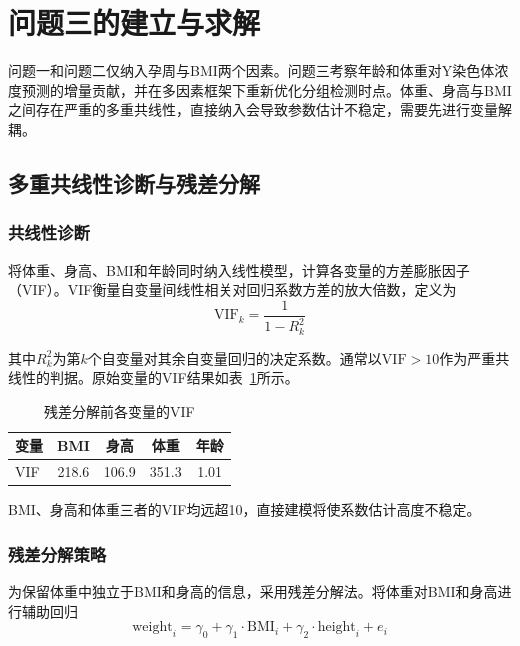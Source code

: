 \section{问题三的建立与求解}

问题一和问题二仅纳入孕周与BMI两个因素。问题三考察年龄和体重对Y染色体浓度预测的增量贡献，并在多因素框架下重新优化分组检测时点。体重、身高与BMI之间存在严重的多重共线性，直接纳入会导致参数估计不稳定，需要先进行变量解耦。

\subsection{多重共线性诊断与残差分解}

\subsubsection{共线性诊断}

将体重、身高、BMI和年龄同时纳入线性模型，计算各变量的方差膨胀因子（VIF）。VIF衡量自变量间线性相关对回归系数方差的放大倍数，定义为
\begin{equation}\label{eq:vif}
  \mathrm{VIF}_k = \frac{1}{1 - R_k^2}
\end{equation}

其中$R_k^2$为第$k$个自变量对其余自变量回归的决定系数。通常以$\mathrm{VIF} > 10$作为严重共线性的判据。原始变量的VIF结果如表~\ref{tab:vif_before}所示。

\begin{table}[H]
  \caption{残差分解前各变量的VIF}
  \label{tab:vif_before}
  \centering
  \begin{tabular}{lcccc}
    \hline
    变量 & BMI & 身高 & 体重 & 年龄 \\
    \hline
    VIF & 218.6 & 106.9 & 351.3 & 1.01 \\
    \hline
  \end{tabular}
\end{table}

BMI、身高和体重三者的VIF均远超10，直接建模将使系数估计高度不稳定。

\subsubsection{残差分解策略}

为保留体重中独立于BMI和身高的信息，采用残差分解法。将体重对BMI和身高进行辅助回归
\begin{equation}\label{eq:resid_decomp}
  \text{weight}_i = \gamma_0 + \gamma_1 \cdot \mathrm{BMI}_i + \gamma_2 \cdot \text{height}_i + e_i
\end{equation}

